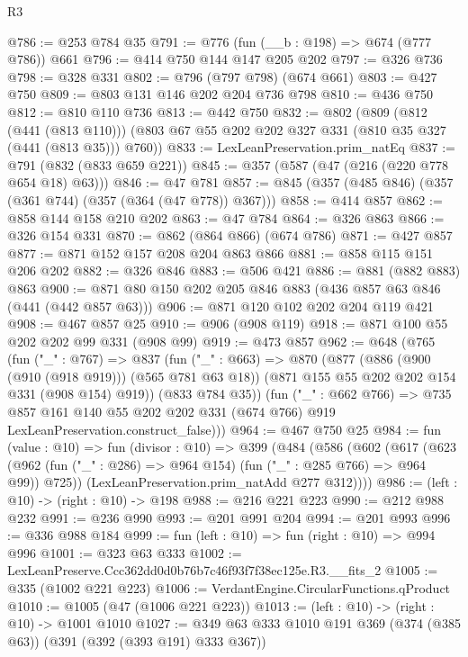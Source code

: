 \begin{lexlean}{R3}
\begin{coremodule}
@786 := @253 @784 @35
@791 := @776 (fun (__b : @198) => @674 (@777 @786)) @661
@796 := @414 @750 @144 @147 @205 @202
@797 := @326 @736
@798 := @328 @331
@802 := @796 (@797 @798) (@674 @661)
@803 := @427 @750
@809 := @803 @131 @146 @202 @204 @736 @798
@810 := @436 @750
@812 := @810 @110 @736
@813 := @442 @750
@832 := @802
    (@809
      (@812 (@441 (@813 @110)))
      (@803 @67 @55 @202 @202 @327 @331 (@810 @35 @327 (@441 (@813 @35))) @760))
@833 := LexLeanPreservation.prim_natEq
@837 := @791 (@832 (@833 @659 @221))
@845 := @357 (@587 (@47 (@216 (@220 @778 @654 @18) @63)))
@846 := @47 @781
@857 := @845 (@357 (@485 @846) (@357 (@361 @744) (@357 (@364 (@47 @778)) @367)))
@858 := @414 @857
@862 := @858 @144 @158 @210 @202
@863 := @47 @784
@864 := @326 @863
@866 := @326 @154 @331
@870 := @862 (@864 @866) (@674 @786)
@871 := @427 @857
@877 := @871 @152 @157 @208 @204 @863 @866
@881 := @858 @115 @151 @206 @202
@882 := @326 @846
@883 := @506 @421
@886 := @881 (@882 @883) @863
@900 := @871 @80 @150 @202 @205 @846 @883 (@436 @857 @63 @846 (@441 (@442 @857 @63)))
@906 := @871 @120 @102 @202 @204 @119 @421
@908 := @467 @857 @25
@910 := @906 (@908 @119)
@918 := @871 @100 @55 @202 @202 @99 @331 (@908 @99)
@919 := @473 @857
@962 := @648
    (@765
      (fun ("_" : @767) =>
      @837
        (fun ("_" : @663) =>
        @870
          (@877
            (@886 (@900 (@910 (@918 @919))) (@565 @781 @63 @18))
            (@871 @155 @55 @202 @202 @154 @331 (@908 @154) @919))
          (@833 @784 @35))
        (fun ("_" : @662 @766) =>
        @735
          @857
          @161
          @140
          @55
          @202
          @202
          @331
          (@674 @766)
          @919
          LexLeanPreservation.construct_false)))
@964 := @467 @750 @25
@984 := fun (value : @10) =>
  fun (divisor : @10) =>
  @399
    (@484
      (@586
        (@602
          (@617
            (@623 (@962 (fun ("_" : @286) => @964 @154) (fun ("_" : @285 @766) => @964 @99)) @725))
          (LexLeanPreservation.prim_natAdd @277 @312))))
@986 := (left : @10) -> (right : @10) -> @198
@988 := @216 @221 @223
@990 := @212 @988 @232
@991 := @236 @990
@993 := @201 @991 @204
@994 := @201 @993
@996 := @336 @988 @184
@999 := fun (left : @10) => fun (right : @10) => @994 @996
@1001 := @323 @63 @333
@1002 := LexLeanPreserve.Ccc362dd0d0b76b7c46f93f7f38ec125e.R3.__fits_2
@1005 := @335 (@1002 @221 @223)
@1006 := VerdantEngine.CircularFunctions.qProduct
@1010 := @1005 (@47 (@1006 @221 @223))
@1013 := (left : @10) -> (right : @10) -> @1001 @1010
@1027 := @349 @63 @333 @1010 @191 @369 (@374 (@385 @63)) (@391 (@392 (@393 @191) @333 @367))

\end{coremodule}
\end{lexlean}
